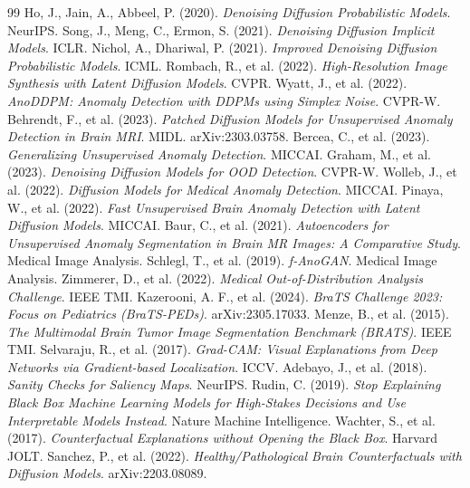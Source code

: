 \documentclass[12pt, a4paper]{article}
\theoremstyle{definition}\newtheorem{definition}{Definition}
\begin{document}
\begin{thebibliography}{99}
\small
{} Ho, J., Jain, A., Abbeel, P. (2020). \textit{Denoising Diffusion Probabilistic Models}. NeurIPS.
 Song, J., Meng, C., Ermon, S. (2021). \textit{Denoising Diffusion Implicit Models}. ICLR.
 Nichol, A., Dhariwal, P. (2021). \textit{Improved Denoising Diffusion Probabilistic Models}. ICML.
 Rombach, R., et al. (2022). \textit{High-Resolution Image Synthesis with Latent Diffusion Models}. CVPR.
 Wyatt, J., et al. (2022). \textit{AnoDDPM: Anomaly Detection with DDPMs using Simplex Noise}. CVPR-W.
 Behrendt, F., et al. (2023). \textit{Patched Diffusion Models for Unsupervised Anomaly Detection in Brain MRI}. MIDL. arXiv:2303.03758.
 Bercea, C., et al. (2023). \textit{Generalizing Unsupervised Anomaly Detection}. MICCAI.
 Graham, M., et al. (2023). \textit{Denoising Diffusion Models for OOD Detection}. CVPR-W.
 Wolleb, J., et al. (2022). \textit{Diffusion Models for Medical Anomaly Detection}. MICCAI.
 Pinaya, W., et al. (2022). \textit{Fast Unsupervised Brain Anomaly Detection with Latent Diffusion Models}. MICCAI.
 Baur, C., et al. (2021). \textit{Autoencoders for Unsupervised Anomaly Segmentation in Brain MR Images: A Comparative Study}. Medical Image Analysis.
 Schlegl, T., et al. (2019). \textit{f-AnoGAN}. Medical Image Analysis.
 Zimmerer, D., et al. (2022). \textit{Medical Out-of-Distribution Analysis Challenge}. IEEE TMI.
 Kazerooni, A. F., et al. (2024). \textit{BraTS Challenge 2023: Focus on Pediatrics (BraTS-PEDs)}. arXiv:2305.17033.
 Menze, B., et al. (2015). \textit{The Multimodal Brain Tumor Image Segmentation Benchmark (BRATS)}. IEEE TMI.
 Selvaraju, R., et al. (2017). \textit{Grad-CAM: Visual Explanations from Deep Networks via Gradient-based Localization}. ICCV.
 Adebayo, J., et al. (2018). \textit{Sanity Checks for Saliency Maps}. NeurIPS.
 Rudin, C. (2019). \textit{Stop Explaining Black Box Machine Learning Models for High-Stakes Decisions and Use Interpretable Models Instead}. Nature Machine Intelligence.
 Wachter, S., et al. (2017). \textit{Counterfactual Explanations without Opening the Black Box}. Harvard JOLT.
 Sanchez, P., et al. (2022). \textit{Healthy/Pathological Brain Counterfactuals with Diffusion Models}. arXiv:2203.08089.

\end{thebibliography}
\end{document}
